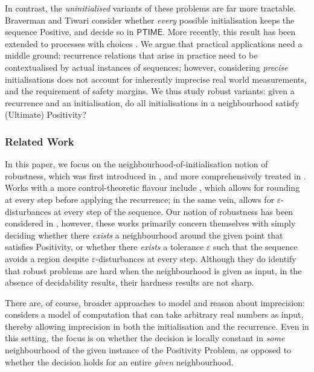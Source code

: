 In contrast, the \textit{uninitialised} variants of these problems are far more tractable. Braverman \cite{Braverman06} and Tiwari \cite{Tiwari04} consider whether \textit{every} possible initialisation keeps the sequence Positive, and decide so in $\mathsf{PTIME}$. More recently, this result has been extended to processes with choices \cite{AGV18}. We argue that practical applications need a middle ground: recurrence relations that arise in practice need to be contextualised by actual instances of sequences; however, considering \textit{precise} initialisations does not account for inherently imprecise real world measurements, and the requirement of safety margins. We thus study robust variants: given a recurrence and an initialisation, do all initialisations in a neighbourhood satisfy (Ultimate) Positivity?

\subsubsection*{Related Work} 
In this paper, we focus on the neighbourhood-of-initialisation notion of robustness, which was first introduced in \cite{originalstacs}, and more comprehensively treated in \cite{originalarxiv}.  Works with a more control-theoretic flavour include \cite{rounding20}, which allows for rounding at every step before applying the recurrence; in the same vein, \cite{pseudo21} allows for $\varepsilon$-disturbances at every step of the sequence. Our notion of robustness has been considered in \cite{originalstacs,originalarxiv,pseudo21}, however, these works primarily concern themselves with simply deciding whether there \textit{exists} a neighbourhood around the given point that satisfies Positivity, or whether there \textit{exists} a tolerance $\varepsilon$ such that the sequence avoids a region despite $\varepsilon$-disturbances at every step. Although they do identify that robust problems are hard when the neighbourhood is given as input, in the absence of decidability results, their hardness results are not sharp. 

There are, of course, broader approaches to model and reason about imprecision: \cite{N21} considers a model of computation that can take arbitrary real numbers as input, thereby allowing imprecision in both the initialisation and the recurrence. Even in this setting, the focus is on whether the decision is locally constant in \textit{some} neighbourhood of the given instance of the Positivity Problem, as opposed to whether the decision holds for an entire \textit{given} neighbourhood.

